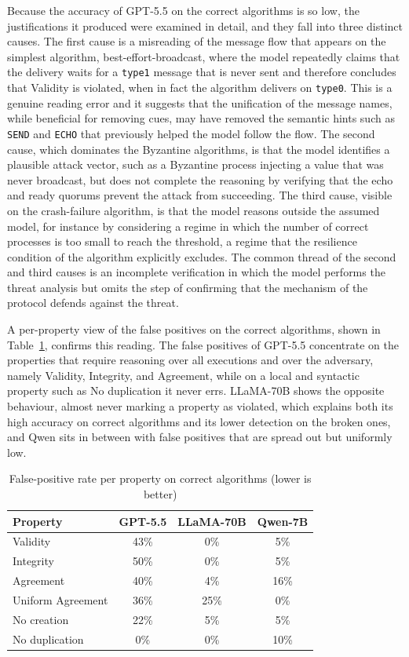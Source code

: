 Because the accuracy of GPT-5.5 on the correct algorithms is so low, the justifications it produced were examined in detail, and they fall into three distinct causes. The first cause is a misreading of the message flow that appears on the simplest algorithm, best-effort-broadcast, where the model repeatedly claims that the delivery waits for a \texttt{type1} message that is never sent and therefore concludes that Validity is violated, when in fact the algorithm delivers on \texttt{type0}. This is a genuine reading error and it suggests that the unification of the message names, while beneficial for removing cues, may have removed the semantic hints such as \texttt{SEND} and \texttt{ECHO} that previously helped the model follow the flow. The second cause, which dominates the Byzantine algorithms, is that the model identifies a plausible attack vector, such as a Byzantine process injecting a value that was never broadcast, but does not complete the reasoning by verifying that the echo and ready quorums prevent the attack from succeeding. The third cause, visible on the crash-failure algorithm, is that the model reasons outside the assumed model, for instance by considering a regime in which the number of correct processes is too small to reach the threshold, a regime that the resilience condition of the algorithm explicitly excludes. The common thread of the second and third causes is an incomplete verification in which the model performs the threat analysis but omits the step of confirming that the mechanism of the protocol defends against the threat.

A per-property view of the false positives on the correct algorithms, shown in Table~\ref{tab:final-property}, confirms this reading. The false positives of GPT-5.5 concentrate on the properties that require reasoning over all executions and over the adversary, namely Validity, Integrity, and Agreement, while on a local and syntactic property such as No duplication it never errs. LLaMA-70B shows the opposite behaviour, almost never marking a property as violated, which explains both its high accuracy on correct algorithms and its lower detection on the broken ones, and Qwen sits in between with false positives that are spread out but uniformly low.

\begin{table}[H]
\centering
\renewcommand{\arraystretch}{1.3}
\caption{False-positive rate per property on correct algorithms (lower is better)}
\label{tab:final-property}
\begin{tabular}{|l|c|c|c|}
\hline
\textbf{Property} & \textbf{GPT-5.5} & \textbf{LLaMA-70B} & \textbf{Qwen-7B} \\
\hline
Validity & 43\% & 0\% & 5\% \\
Integrity & 50\% & 0\% & 5\% \\
Agreement & 40\% & 4\% & 16\% \\
Uniform Agreement & 36\% & 25\% & 0\% \\
No creation & 22\% & 5\% & 5\% \\
No duplication & 0\% & 0\% & 10\% \\
\hline
\end{tabular}
\end{table}

